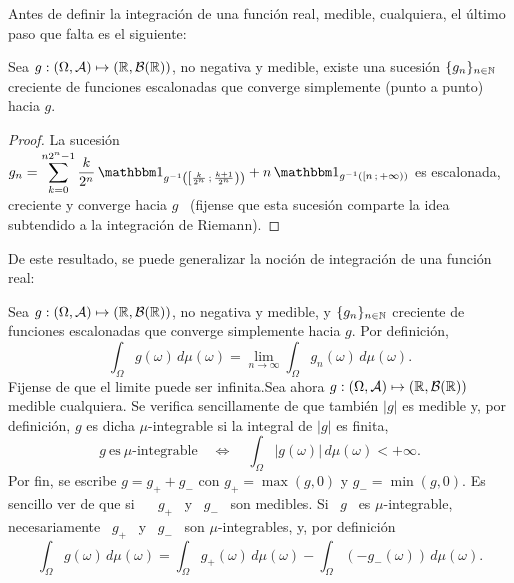 Antes de definir la integraci\'on de una funci\'on real, medible, cualquiera, el
\'ultimo paso que falta es el siguiente:
%
\begin{teorema}\label{Th:MP:MedibleLimite}
  Sea $g: (\Omega,\mathcal{A}) \mapsto  (\mathbb{R},\mathcal{B}(\mathbb{R}))$, no negativa y medible, existe
  una sucesi\'on  $\{ g_n \}_{n  \in \mathbb{N}}$ creciente de  funciones escalonadas
  que converge simplemente (punto a punto) hacia $g$.
\end{teorema}
%
\begin{proof}
  La  sucesi\'on  $\displaystyle g_n  =  \sum_{k=0}^{n  2^n-1} \frac{k}{2^n}  \,
  \un_{g^{-1}\left(  \left[  \frac{k}{2^n}   \,  ;  \,  \frac{k+1}{2^n}  \right)
    \right)} + n \, \un_{g^{-1}\left( \left[ n \, ; \, +\infty \right) \right)}$
  es escalonada, creciente  y converge hacia $g$ \  (fijense que esta sucesi\'on
  comparte la idea subtendido a la integraci\'on de Riemann).
\end{proof}

De  este resultado, se  puede generalizar  la noci\'on  de integraci\'on  de una
funci\'on real:
%
\begin{definicion}\label{Def:MP:IntegracionReal}
  Sea $g: (\Omega,\mathcal{A})  \mapsto (\mathbb{R},\mathcal{B}(\mathbb{R}))$, no negativa y  medible, y $\{
  g_n  \}_{n  \in  \mathbb{N}}$  creciente  de  funciones  escalonadas  que  converge
  simplemente hacia $g$. Por definici\'on,
  \[
  \int_{\Omega}  g(\omega) \,  d\mu(\omega)  = \lim_{n  \to \infty}  \int_\Omega
  g_n(\omega) \, d\mu(\omega).
  \]
  Fijense de que el limite puede ser infinita.\newline Sea ahora $g: (\Omega,\mathcal{A})
  \mapsto (\mathbb{R},\mathcal{B}(\mathbb{R}))$  medible cualquiera.  Se  verifica sencillamente de
  que  tambi\'en   $|g|$  es   medible  y,  por   definici\'on,  $g$   es  dicha
  $\mu$-integrable si la integral de $|g|$ es finita,
  \[
  g   \:  \mbox{es}   \:  \mu\mbox{-integrable}   \quad   \Leftrightarrow  \quad
  \int_\Omega |g(\omega)| \, d\mu(\omega) < +\infty.
  \]
  Por  fin,  se escribe  $g  =  g_+  + g_-$  con  $g_+  =  \max(g,0)$ y  $g_-  =
  \min(g,0)$. Es sencillo ver de que si  \  \ $g_+$ \ y
  \ $g_-$ \ son medibles. Si \ $g$ \ es $\mu$-integrable, necesariamente \ $g_+$
  \ y \ $g_-$ \ son $\mu$-integrables, y, por definici\'on
  \[
  \int_\Omega   g(\omega)   \,  d\mu(\omega)   =   \int_\Omega  g_+(\omega)   \,
  d\mu(\omega) - \int_\Omega \left( - g_-(\omega) \right) \, d\mu(\omega).
  \]
\end{definicion}

